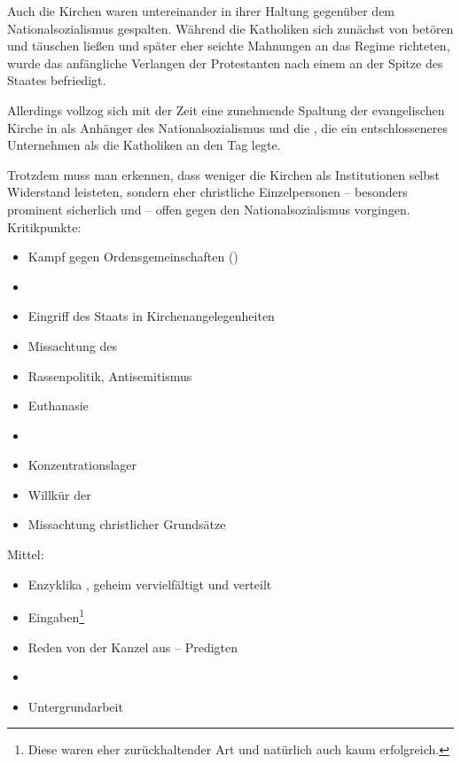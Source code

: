 Auch die Kirchen waren untereinander in ihrer Haltung gegenüber dem
Nationalsozialismus gespalten. Während die Katholiken sich zunächst
von  betören und täuschen ließen und später
eher seichte Mahnungen an das Regime richteten, wurde das anfängliche
Verlangen der Protestanten nach einem  an der Spitze
des Staates befriedigt.

Allerdings vollzog sich mit der Zeit eine zunehmende Spaltung der
evangelischen Kirche in 
als Anhänger des Nationalsozialismus und die ,
die ein entschlosseneres Unternehmen als die Katholiken an den Tag
legte.

Trotzdem muss man erkennen, dass weniger die Kirchen als Institutionen
selbst Widerstand leisteten, sondern eher christliche Einzelpersonen
-- besonders prominent sicherlich  und  --
offen gegen den Nationalsozialismus vorgingen.\\

\noindent Kritikpunkte:

\begin{sloppypar}
\begin{itemize}
\item Kampf gegen Ordensgemeinschaften
()
\item {}
\item Eingriff des Staats in Kirchenangelegenheiten
\item Missachtung des 
\item Rassenpolitik, Antisemitismus
\item Euthanasie
\item {}
\item Konzentrationslager
\item Willkür der 
\item Missachtung christlicher Grundsätze
\end{itemize}
\end{sloppypar}

\noindent Mittel:

\begin{itemize}
\item Enzyklika  , geheim
vervielfältigt und verteilt
\item Eingaben\footnote{Diese waren eher zurückhaltender Art und
natürlich auch kaum erfolgreich.}
\item Reden von der Kanzel aus -- Predigten
\item {}
\item Untergrundarbeit
\end{itemize}


